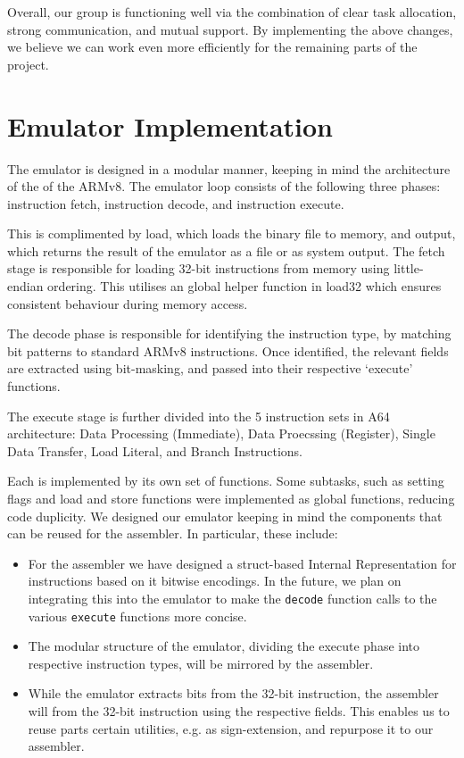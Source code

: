 \documentclass{article}
\begin{document}
Overall, our group is functioning well via the combination of clear task allocation, strong communication, and mutual support. By implementing the above changes, we believe we can work even more efficiently for the remaining parts of the project. 

\section{Emulator Implementation}

The emulator is designed in a modular manner, keeping in mind the architecture of the of the ARMv8. The emulator loop consists of the following three phases: instruction fetch, instruction decode, and instruction execute. 

This is complimented by load, which loads the binary file to memory, and output, which returns the result of the emulator as a file or as system output.
The fetch stage is responsible for loading 32-bit instructions from memory using little-endian ordering. This utilises an global helper function in load32 which ensures consistent behaviour during memory access.

The decode phase is responsible for identifying the instruction type, by matching bit patterns to standard ARMv8 instructions. Once identified, the relevant fields are extracted using bit-masking, and passed into their respective ‘execute’ functions.

The execute stage is further divided into the 5 instruction sets in A64 architecture: 
Data Processing (Immediate), Data Proecssing (Register), Single Data Transfer, Load Literal, and Branch Instructions. 

Each is implemented by its own set of functions. Some subtasks, such as setting flags and load and store functions were implemented as global functions, reducing code duplicity.
We designed our emulator keeping in mind the components that can be reused for the assembler. In particular, these include:
\begin{itemize}
    \item For the assembler we have designed a struct-based Internal Representation for instructions based on it bitwise encodings. In the future, we plan on integrating this into the emulator to make the \verb|decode| function calls to the various \verb|execute| functions more concise. 
    \item The modular structure of the emulator, dividing the execute phase into respective instruction types, will be mirrored by the assembler.
    \item While the emulator extracts bits from the 32-bit instruction, the assembler will from the 32-bit instruction using the respective fields. This enables us to reuse parts certain utilities, e.g. as sign-extension, and repurpose it to our assembler.
\end{itemize}
\end{document}

